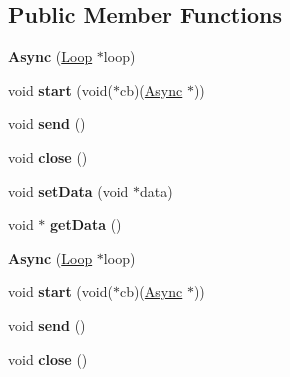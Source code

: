 \subsection*{Public Member Functions}
\begin{DoxyCompactItemize}
\item 
\mbox{\label{struct_async_aed26c1fc97a5eae80339fe5fce86b40a}} 
{\bfseries Async} (\mbox{\hyperlink{struct_loop}{Loop}} $\ast$loop)
\item 
\mbox{\label{struct_async_a9a11c2cc0df4ea36fbede66b76344e89}} 
void {\bfseries start} (void($\ast$cb)(\mbox{\hyperlink{struct_async}{Async}} $\ast$))
\item 
\mbox{\label{struct_async_af2c3b9163ed54bc50210f627ca7451ff}} 
void {\bfseries send} ()
\item 
\mbox{\label{struct_async_a8ef8b28a1f9c5900c3962d99b92393ca}} 
void {\bfseries close} ()
\item 
\mbox{\label{struct_async_a037220bb081dea52ad225c64e5810d1b}} 
void {\bfseries set\+Data} (void $\ast$data)
\item 
\mbox{\label{struct_async_a0aeb784d89f749c2139fd9da075deb45}} 
void $\ast$ {\bfseries get\+Data} ()
\item 
\mbox{\label{struct_async_aed26c1fc97a5eae80339fe5fce86b40a}} 
{\bfseries Async} (\mbox{\hyperlink{struct_loop}{Loop}} $\ast$loop)
\item 
\mbox{\label{struct_async_a9a11c2cc0df4ea36fbede66b76344e89}} 
void {\bfseries start} (void($\ast$cb)(\mbox{\hyperlink{struct_async}{Async}} $\ast$))
\item 
\mbox{\label{struct_async_af2c3b9163ed54bc50210f627ca7451ff}} 
void {\bfseries send} ()
\item 
\mbox{\label{struct_async_a8ef8b28a1f9c5900c3962d99b92393ca}} 
void {\bfseries close} ()
\item 
\mbox{\label{struct_async_a037220bb081dea52ad225c64e5810d1b}} 

\end{DoxyCompactItemize}
